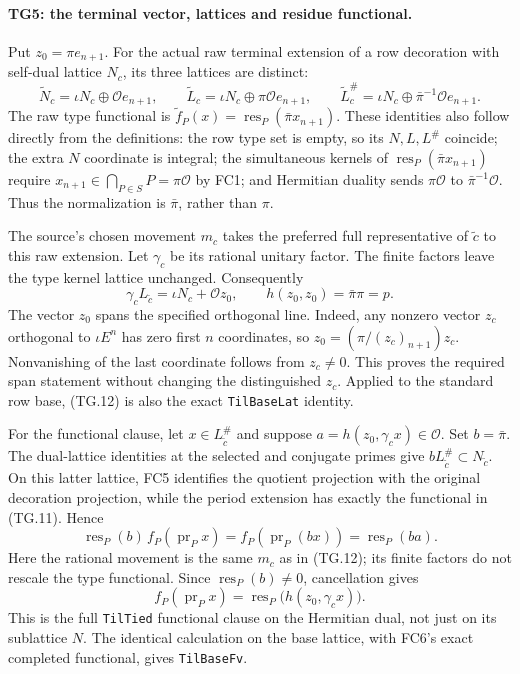 \paragraph{TG5: the terminal vector, lattices and residue functional.}
Put $z_0=\pi e_{n+1}$. For the actual raw terminal extension of a
row decoration with self-dual lattice $N_c$, its three lattices
are distinct:
\[
 \widetilde N_c=\iota N_c\oplus\mathcal Oe_{n+1},\qquad
 \widetilde L_c=\iota N_c\oplus\pi\mathcal Oe_{n+1},\qquad
 \widetilde L_c^{\#}=\iota N_c\oplus\bar\pi^{-1}
                                      \mathcal Oe_{n+1}.
 \tag{TG.11}
\]
The raw type functional is
$\widetilde f_P(x)=\operatorname{res}_P(\bar\pi x_{n+1})$.
These identities also follow directly from the definitions:
the row type set is empty, so its $N,L,L^{\#}$ coincide;
the extra $N$ coordinate is integral; the simultaneous kernels
of $\operatorname{res}_P(\bar\pi x_{n+1})$ require
$x_{n+1}\in\bigcap_{P\in S}P=\pi\mathcal O$ by FC1;
and Hermitian duality sends $\pi\mathcal O$ to
$\bar\pi^{-1}\mathcal O$. Thus the normalization is
$\bar\pi$, rather than $\pi$.

The source's chosen movement $m_c$ takes the preferred full
representative of $\widetilde c$ to this raw extension. Let
$\gamma_c$ be its rational unitary factor. The finite factors
leave the type kernel lattice unchanged. Consequently
\[
 \gamma_c L_{\widetilde c}
      =\iota N_c+\mathcal O z_0,
 \qquad h(z_0,z_0)=\bar\pi\pi=p.
 \tag{TG.12}
\]
The vector $z_0$ spans the specified orthogonal line. Indeed,
any nonzero vector $z_c$ orthogonal to $\iota E^n$ has zero first
$n$ coordinates, so $z_0=(\pi/(z_c)_{n+1})z_c$. Nonvanishing
of the last coordinate follows from $z_c\ne0$. This proves the
required span statement without changing the distinguished
$z_c$. Applied to the standard row base, (TG.12) is also the
exact \texttt{TilBaseLat} identity.

For the functional clause, let $x\in L_{\widetilde c}^{\#}$ and
suppose $a=h(z_0,\gamma_cx)\in\mathcal O$. Set $b=\bar\pi$.
The dual-lattice identities at the selected and conjugate primes
give $bL_{\widetilde c}^{\#}\subset N_{\widetilde c}$.
On this latter lattice, FC5 identifies the quotient projection
with the original decoration projection, while the period
extension has exactly the functional in (TG.11). Hence
\[
 \operatorname{res}_P(b)\,
   f_P(\operatorname{pr}_P x)
   =f_P(\operatorname{pr}_P(bx))
   =\operatorname{res}_P(ba).
 \tag{TG.13}
\]
Here the rational movement is the same $m_c$ as in (TG.12);
its finite factors do not rescale the type functional.
Since $\operatorname{res}_P(b)\ne0$, cancellation gives
\[
 f_P(\operatorname{pr}_P x)
       =\operatorname{res}_P\bigl(h(z_0,\gamma_cx)\bigr).
 \tag{TG.14}
\]
This is the full \texttt{TilTied} functional clause on the
Hermitian dual, not just on its sublattice $N$. The identical
calculation on the base lattice, with FC6's exact completed
functional, gives \texttt{TilBaseFv}.

